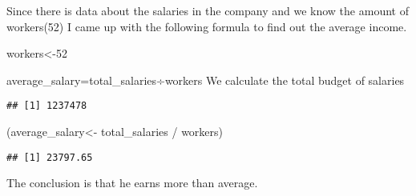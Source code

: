 \documentclass[
]{article}
\newenvironment{Shaded}{\begin{snugshade}}{\end{snugshade}}
\newcommand{\DecValTok}[1]{\textcolor[rgb]{0.00,0.00,0.81}{#1}}
\newcommand{\FunctionTok}[1]{\textcolor[rgb]{0.00,0.00,0.00}{#1}}
\newcommand{\NormalTok}[1]{#1}
\newcommand{\OtherTok}[1]{\textcolor[rgb]{0.56,0.35,0.01}{#1}}
\newcommand{\SpecialCharTok}[1]{\textcolor[rgb]{0.00,0.00,0.00}{#1}}
\begin{document}
Since there is data about the salaries in the company and we know the
amount of workers(52) I came up with the following formula to find out
the average income.

\begin{Shaded}
\begin{Highlighting}[]
\NormalTok{workers}\OtherTok{\textless{}{-}}\DecValTok{52}
\end{Highlighting}
\end{Shaded}

average\_salary=total\_salaries÷workers We calculate the total budget of
salaries

\begin{Shaded}
\end{Shaded}

\begin{verbatim}
## [1] 1237478
\end{verbatim}

\begin{Shaded}
\begin{Highlighting}[]
\NormalTok{(average\_salary}\OtherTok{\textless{}{-}}\NormalTok{ total\_salaries }\SpecialCharTok{/}\NormalTok{ workers)}
\end{Highlighting}
\end{Shaded}

\begin{verbatim}
## [1] 23797.65
\end{verbatim}

The conclusion is that he earns more than average.
\end{document}
